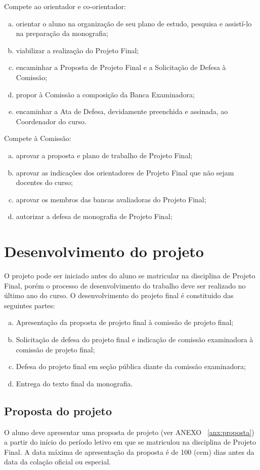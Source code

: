 Compete ao orientador e co-orientador:
\begin{enumerate}[a.]
\item orientar o aluno na organização de seu plano de estudo, pesquisa e assistí-lo na preparação da monografia;
\item viabilizar a realização do Projeto Final;
\item encaminhar a Proposta de Projeto Final e a Solicitação de Defesa à Comissão;
\item propor à Comissão a composição da Banca Examinadora;
\item encaminhar a Ata de Defesa, devidamente preenchida e assinada, ao Coordenador do curso.
\end{enumerate}

Compete à Comissão:
\begin{enumerate}[a.]
\item aprovar a proposta e plano de trabalho de Projeto Final;
\item aprovar as indicações dos orientadores de Projeto Final que não sejam docentes do curso;
\item aprovar os membros das bancas avaliadoras do Projeto Final;
\item autorizar a defesa de monografia de Projeto Final;
\end{enumerate}

\section{Desenvolvimento do projeto}

O projeto pode ser iniciado antes do aluno se matricular na disciplina de Projeto Final, porém o 
processo de desenvolvimento do trabalho deve ser realizado no último ano do curso. O desenvolvimento
do projeto final é constituido das seguintes partes:

\begin{enumerate}[a.]
\item Apresentação da proposta de projeto final à comissão de projeto final;
\item Solicitação de defesa do projeto final e indicação de comissão examinadora à comissão de projeto final;
\item Defesa do projeto final em seção pública diante da comissão examinadora;
\item Entrega do texto final da monografia.
\end{enumerate}


\subsection{Proposta do projeto} 
O aluno deve apresentar uma proposta de projeto (ver ANEXO ~\ref{anx:proposta}) a partir do início do período
letivo em que se matriculou na disciplina de Projeto Final. A data máxima de apresentação da
proposta é de 100 (cem) dias antes da data da colação oficial ou especial.


